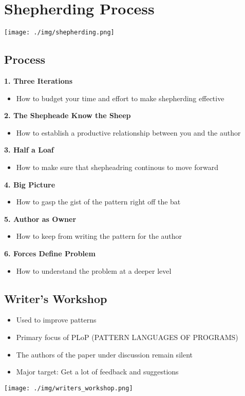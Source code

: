 
\section{Shepherding Process}
\texttt{[image: ./img/shepherding.png]}
\subsection{Process}
\textbf{1. Three Iterations}
\begin{itemize}
    \item How to budget your time and effort to make shepherding effective
\end{itemize}
\textbf{2. The Shepheade Know the Sheep}
\begin{itemize}
    \item How to establish a productive relationship between you and the author
\end{itemize}
\textbf{3. Half a Loaf}
\begin{itemize}
    \item How to make sure that shepheadring continous to move forward
\end{itemize}
\textbf{4. Big Picture}
\begin{itemize}
    \item How to gasp the gist of the pattern right off the bat
\end{itemize}
\textbf{5. Author as Owner}
\begin{itemize}
    \item How to keep from writing the pattern for the author
\end{itemize}
\textbf{6. Forces Define Problem}
\begin{itemize}
    \item How to understand the problem at a deeper level
\end{itemize}

\subsection{Writer's Workshop}
\begin{itemize}
    \item Used to improve patterns
    \item Primary focus of PLoP (PATTERN LANGUAGES OF PROGRAMS)
    \item The authors of the paper under discussion remain silent
    \item Major target: Get a lot of feedback and suggestions
\end{itemize}
\texttt{[image: ./img/writers\_workshop.png]}

